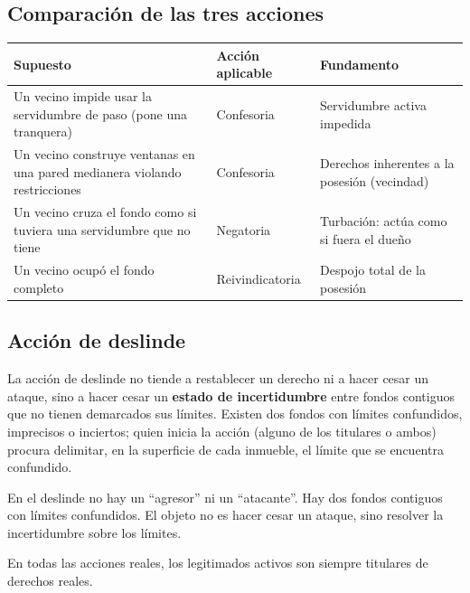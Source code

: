 \documentclass[12pt,oneside]{book}
\begin{document}
\subsection{Comparación de las tres acciones}

\begin{table}[H]
\centering
\small
\begin{tabularx}{\textwidth}{@{}>{\raggedright\arraybackslash}X>{\raggedright\arraybackslash}p{}>{\raggedright\arraybackslash}X@{}}
\toprule
\textbf{Supuesto} & \textbf{Acción aplicable} & \textbf{Fundamento} \\
\midrule
Un vecino impide usar la servidumbre de paso (pone una tranquera) & Confesoria & Servidumbre activa impedida \\
Un vecino construye ventanas en una pared medianera violando restricciones & Confesoria & Derechos inherentes a la posesión (vecindad) \\
Un vecino cruza el fondo como si tuviera una servidumbre que no tiene & Negatoria & Turbación: actúa como si fuera el dueño \\
Un vecino ocupó el fondo completo & Reivindicatoria & Despojo total de la posesión \\
\bottomrule
\end{tabularx}
\end{table}

\subsection{Acción de deslinde}

La acción de deslinde no tiende a restablecer un derecho ni a hacer cesar un ataque, sino a hacer cesar un \textbf{estado de incertidumbre} entre fondos contiguos que no tienen demarcados sus límites. Existen dos fondos con límites confundidos, imprecisos o inciertos; quien inicia la acción (alguno de los titulares o ambos) procura delimitar, en la superficie de cada inmueble, el límite que se encuentra confundido.

\begin{importante}
En el deslinde no hay un ``agresor'' ni un ``atacante''. Hay dos fondos contiguos con límites confundidos. El objeto no es hacer cesar un ataque, sino resolver la incertidumbre sobre los límites.
\end{importante}

En todas las acciones reales, los legitimados activos son siempre titulares de derechos reales.
\end{document}
